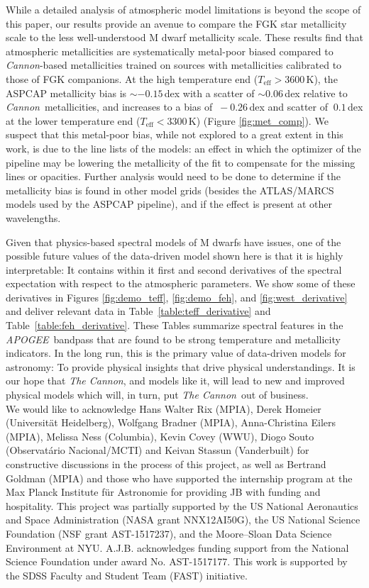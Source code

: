 \documentclass[twocolumn]{aastex62}
\newcommand{\apogee}{\textsl{APOGEE}}
\newcommand{\thecannon}{\textsl{The Cannon}}
\newcommand{\cannon}{\textsl{Cannon}}
\newcommand{\teff}{T_{\mathrm{eff}}}
\begin{document}
While a detailed analysis of atmospheric model limitations is beyond the scope of this paper, 
our results provide an avenue to compare the FGK star metallicity scale 
to the less well-understood M dwarf metallicity scale.
These results find that atmospheric metallicities are systematically metal-poor biased
compared to \cannon-based metallicities trained on sources with metallicities calibrated
to those of FGK companions. 
At the high temperature end ($\teff > 3600$\,K), the ASPCAP metallicity bias is $\sim-0.15\,$dex with a
scatter of $\sim0.06\,$dex relative to \cannon\ metallicities, and increases to a bias of $\>-0.26\,$dex 
and scatter of $\>0.1\,$dex at the lower temperature end ($\teff < 3300$\,K) (Figure \ref{fig:met_comp}).
We suspect that this metal-poor bias, while not explored to a great extent in this work, is due 
to the line lists of the models: 
an effect in which the optimizer of the pipeline may be lowering the metallicity of the fit 
to compensate for the missing lines or opacities.
Further analysis would need to be done to determine if the metallicity bias
is found in other model grids (besides the ATLAS/MARCS models used by the ASPCAP pipeline), 
and if the effect is present at other wavelengths.

Given that physics-based spectral models of M dwarfs have issues, one of the possible
future values of the data-driven model shown here is that it is highly interpretable:
It contains within it first and second derivatives of the spectral expectation with
respect to the atmospheric parameters.
We show some of these derivatives in Figures \ref{fig:demo_teff}, \ref{fig:demo_feh}, and \ref{fig:west_derivative} and deliver relevant data in
Table~\ref{table:teff_derivative} and Table~\ref{table:feh_derivative}.
These Tables summarize spectral features in the \apogee\ bandpass
that are found to be strong temperature and metallicity indicators.
In the long run, this is the primary value of data-driven models for astronomy:
To provide physical insights that drive physical understandings.
It is our hope that \thecannon, and models like it, will lead to
new and improved physical models which will, in turn, put \thecannon\ out of business. \\

\acknowledgements
We would like to acknowledge Hans Walter Rix (MPIA), Derek Homeier (Universit{\"a}t Heidelberg), Wolfgang Bradner (MPIA), Anna-Christina Eilers (MPIA), Melissa Ness (Columbia), Kevin Covey (WWU), Diogo Souto (Observatário Nacional/MCTI) and Keivan Stassun (Vanderbuilt) for constructive discussions in the process of this project, as well as Bertrand Goldman (MPIA) and those who have supported the internship program at the Max Planck Institute f{\"u}r Astronomie for providing JB with funding and hospitality.
This project was partially supported by
the US National Aeronautics and Space Administration (NASA grant NNX12AI50G),
the US National Science Foundation (NSF grant AST-1517237),
and the Moore--Sloan Data Science Environment at NYU.
A.J.B. acknowledges funding support from the National Science Foundation under award No. AST-1517177.
This work is supported by the SDSS Faculty and Student Team (FAST) initiative.
\end{document}
